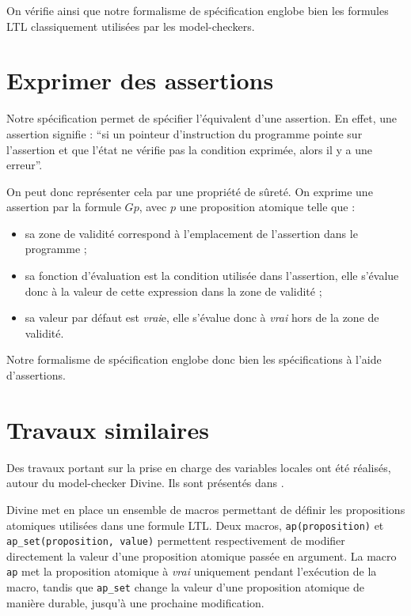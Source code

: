 On vérifie ainsi que notre formalisme de spécification englobe bien les formules
\ac{LTL} classiquement utilisées par les model-checkers.

\section{Exprimer des assertions}

Notre spécification permet de spécifier l'équivalent d'une assertion. En
effet, une assertion signifie : ``si un pointeur d'instruction du
programme pointe sur l'assertion et que l'état ne vérifie pas la
condition exprimée, alors il y a une erreur''.

On peut donc représenter cela par une propriété de sûreté. On exprime
une assertion par la formule \(G p\), avec \(p\) une proposition
atomique telle que :

\begin{itemize}
\item
  sa zone de validité correspond à l'emplacement de l'assertion dans le
  programme ;
\item
  sa fonction d'évaluation est la condition utilisée dans l'assertion,
  elle s'évalue donc à la valeur de cette expression dans la zone de
  validité ;
\item
  sa valeur par défaut est \emph{vrai}e, elle s'évalue donc à \emph{vrai}
  hors de la zone de validité.
\end{itemize}

Notre formalisme de spécification englobe donc bien les spécifications à l'aide
d'assertions.

\section{Travaux similaires}\label{sec:related_work}

Des travaux portant sur la prise en charge des variables locales ont été réalisés,
autour du model-checker Divine\cite{Divine_3_0}. Ils sont présentés dans
\cite{Divine_LTL}.

Divine met en place un ensemble de macros permettant de définir les propositions
atomiques utilisées dans une formule LTL. Deux macros, \texttt{ap(proposition)}
et \texttt{ap\_set(proposition, value)} permettent respectivement de modifier
directement la valeur d'une proposition atomique passée en argument. La macro \texttt{ap}
met la proposition atomique à \emph{vrai} uniquement pendant l'exécution de
la macro, tandis que \texttt{ap\_set} change la valeur d'une proposition
atomique de manière durable, jusqu'à une prochaine modification.

